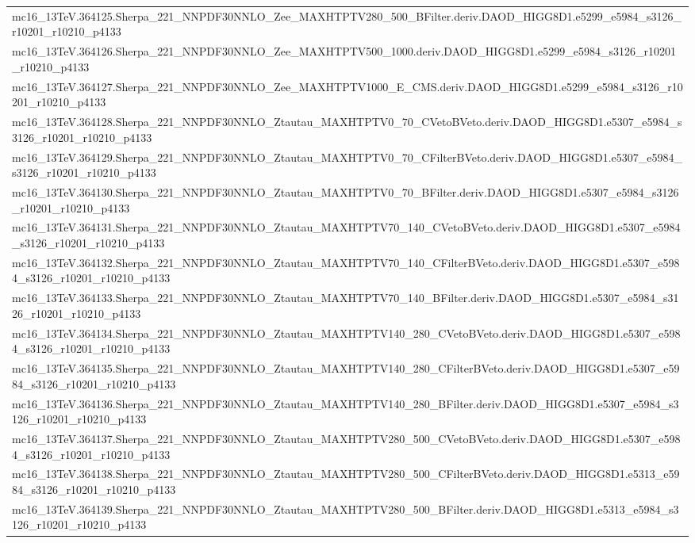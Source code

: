 \begin{adjustwidth}{-3em}{-3em}
\begin{longtable}{l}
mc16\_13TeV.364125.Sherpa\_221\_NNPDF30NNLO\_Zee\_MAXHTPTV280\_500\_BFilter.deriv.DAOD\_HIGG8D1.e5299\_e5984\_s3126\_r10201\_r10210\_p4133 \\
mc16\_13TeV.364126.Sherpa\_221\_NNPDF30NNLO\_Zee\_MAXHTPTV500\_1000.deriv.DAOD\_HIGG8D1.e5299\_e5984\_s3126\_r10201\_r10210\_p4133 \\
mc16\_13TeV.364127.Sherpa\_221\_NNPDF30NNLO\_Zee\_MAXHTPTV1000\_E\_CMS.deriv.DAOD\_HIGG8D1.e5299\_e5984\_s3126\_r10201\_r10210\_p4133 \\
mc16\_13TeV.364128.Sherpa\_221\_NNPDF30NNLO\_Ztautau\_MAXHTPTV0\_70\_CVetoBVeto.deriv.DAOD\_HIGG8D1.e5307\_e5984\_s3126\_r10201\_r10210\_p4133 \\
mc16\_13TeV.364129.Sherpa\_221\_NNPDF30NNLO\_Ztautau\_MAXHTPTV0\_70\_CFilterBVeto.deriv.DAOD\_HIGG8D1.e5307\_e5984\_s3126\_r10201\_r10210\_p4133 \\
mc16\_13TeV.364130.Sherpa\_221\_NNPDF30NNLO\_Ztautau\_MAXHTPTV0\_70\_BFilter.deriv.DAOD\_HIGG8D1.e5307\_e5984\_s3126\_r10201\_r10210\_p4133 \\
mc16\_13TeV.364131.Sherpa\_221\_NNPDF30NNLO\_Ztautau\_MAXHTPTV70\_140\_CVetoBVeto.deriv.DAOD\_HIGG8D1.e5307\_e5984\_s3126\_r10201\_r10210\_p4133 \\
mc16\_13TeV.364132.Sherpa\_221\_NNPDF30NNLO\_Ztautau\_MAXHTPTV70\_140\_CFilterBVeto.deriv.DAOD\_HIGG8D1.e5307\_e5984\_s3126\_r10201\_r10210\_p4133 \\
mc16\_13TeV.364133.Sherpa\_221\_NNPDF30NNLO\_Ztautau\_MAXHTPTV70\_140\_BFilter.deriv.DAOD\_HIGG8D1.e5307\_e5984\_s3126\_r10201\_r10210\_p4133 \\
mc16\_13TeV.364134.Sherpa\_221\_NNPDF30NNLO\_Ztautau\_MAXHTPTV140\_280\_CVetoBVeto.deriv.DAOD\_HIGG8D1.e5307\_e5984\_s3126\_r10201\_r10210\_p4133 \\
mc16\_13TeV.364135.Sherpa\_221\_NNPDF30NNLO\_Ztautau\_MAXHTPTV140\_280\_CFilterBVeto.deriv.DAOD\_HIGG8D1.e5307\_e5984\_s3126\_r10201\_r10210\_p4133 \\
mc16\_13TeV.364136.Sherpa\_221\_NNPDF30NNLO\_Ztautau\_MAXHTPTV140\_280\_BFilter.deriv.DAOD\_HIGG8D1.e5307\_e5984\_s3126\_r10201\_r10210\_p4133 \\
mc16\_13TeV.364137.Sherpa\_221\_NNPDF30NNLO\_Ztautau\_MAXHTPTV280\_500\_CVetoBVeto.deriv.DAOD\_HIGG8D1.e5307\_e5984\_s3126\_r10201\_r10210\_p4133 \\
mc16\_13TeV.364138.Sherpa\_221\_NNPDF30NNLO\_Ztautau\_MAXHTPTV280\_500\_CFilterBVeto.deriv.DAOD\_HIGG8D1.e5313\_e5984\_s3126\_r10201\_r10210\_p4133 \\
mc16\_13TeV.364139.Sherpa\_221\_NNPDF30NNLO\_Ztautau\_MAXHTPTV280\_500\_BFilter.deriv.DAOD\_HIGG8D1.e5313\_e5984\_s3126\_r10201\_r10210\_p4133 \\

\end{longtable}
\end{adjustwidth}
